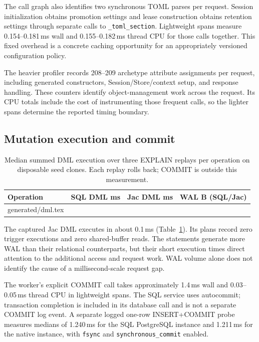 \documentclass[sigconf,nonacm]{acmart}
\makeatletter
\newcommand{\code}[1]{\texttt{#1}}
\newcommand{\tableinput}[1]{\@@input #1 }
\makeatother
\begin{document}
The call graph also identifies two synchronous TOML parses per request.
Session initialization obtains promotion settings and lease construction
obtains retention settings through separate calls to \code{\_toml\_section}.
Lightweight spans measure 0.154--0.181\,ms wall and 0.155--0.182\,ms thread
CPU for those calls together. This fixed overhead is a concrete caching
opportunity for an appropriately versioned configuration policy.

The heavier profiler records 208--209 archetype attribute assignments per
request, including generated constructors, Session/Store/context setup, and
response handling. These counters identify object-management work across the
request. Its CPU totals include the cost of instrumenting those frequent
calls, so the lighter spans determine the reported timing boundary.

\subsection{Mutation execution and commit}
\begin{table}[t]
\caption{Median summed DML execution over three EXPLAIN replays per
operation on disposable seed clones. Each replay rolls back; COMMIT is
outside this measurement.}
\label{tab:dml}
\centering\small
\setlength{\tabcolsep}{4pt}
\begin{tabular}{lrrr}
\toprule
Operation & SQL DML ms & Jac DML ms & WAL B (SQL/Jac) \\
\midrule
\tableinput{generated/dml.tex}
\bottomrule
\end{tabular}
\end{table}

The captured Jac DML executes in about 0.1\,ms
(Table~\ref{tab:dml}). Its plans record zero trigger executions and zero
shared-buffer reads. The statements generate more WAL than their relational
counterparts, but their short execution times direct attention to the
additional access and request work. WAL volume alone does not identify the
cause of a millisecond-scale request gap.

The worker's explicit COMMIT call takes approximately 1.4\,ms wall and
0.03--0.05\,ms thread CPU in lightweight spans. The SQL service uses
autocommit; transaction completion is included in its database call and is
not a separate COMMIT log event. A separate logged one-row INSERT+COMMIT probe
measures medians of 1.240\,ms for the SQL PostgreSQL instance and 1.211\,ms for
the native instance, with \code{fsync} and \code{synchronous\_commit} enabled.
\end{document}
